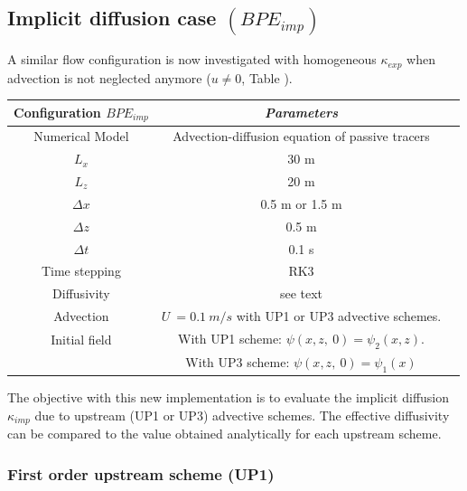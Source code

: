 \subsection{Implicit diffusion case $(BPE_{imp})$}
A similar flow configuration is now investigated with homogeneous $\kappa_{exp}$ when advection is not neglected anymore ($u \ne 0$, Table ).
\begin{table}[h]
        \centering
        \begin{tabular}{|c|c|c|}
                \hline
                Configuration $BPE_{imp}$ & \textit{Parameters}\\
                \hline 
                Numerical Model & Advection-diffusion equation of passive tracers\\
                $L_x$ & 30 m\\
                $L_z$ & 20 m\\
                $\Delta x$ & 0.5 m or 1.5 m\\
                $\Delta z$ & 0.5 m\\
                $\Delta t$ & 0.1 s\\
                Time stepping & RK3 \\
                Diffusivity & see text \\
                Advection & $U\ = 0.1\ m/s$ with UP1 or UP3 advective schemes.\\
                Initial field & With UP1 scheme: $\psi(x, z,\ 0)=\psi_2(x,z)$. \\
                 & With UP3 scheme: $\psi(x, z,\ 0)=\psi_1(x)$\\
                \hline
        \end{tabular}
        \label{tab_NUMLAB_imp}
\end{table}

The objective with this new implementation is to evaluate the implicit diffusion $\kappa_{imp}$ due to upstream (UP1 or UP3) advective schemes. The effective diffusivity can be compared to the value obtained analytically for each upstream scheme. 

\subsubsection{First order upstream scheme (UP1)}

